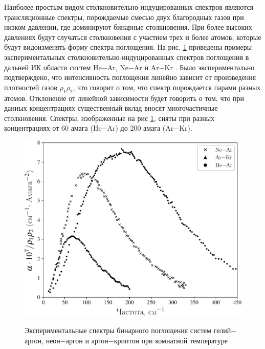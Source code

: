     Наиболее простым видом столкновительно-индуцированных спектров являются трансляционные спектры, порождаемые смесью двух благородных газов при низком давлении, где доминируют бинарные столкновения. При более высоких давлениях будут случаться столкновения с участием трех и более атомов, которые будут видоизменять форму спектра поглощения. На рис. \ref{pic-two-atom-experiment} приведены примеры экспериментальных столкновительно-индуцированных спектров поглощения в дальней ИК области систем He$-$Ar, Ne$-$Ar и Ar$-$Kr \cite{frommhold}. Было экспериментально подтверждено, что интенсивность поглощения линейно зависит от произведения плотностей газов $\rho_1 \rho_2$, что говорит о том, что спектр порождается парами разных атомов. Отклонение от линейной зависимости будет говорить о том, что при данных концентрациях существенный вклад вносят многочастичные столкновения. Спектры, изображенные на рис \ref{pic-two-atom-experiment}, сняты при разных концентрациях от 60 амага (He$-$Ar) до 200 амага (Ar$-$Kr).  

\begin{figure}[H]
    \centering
    \includegraphics[width=0.7\linewidth]{./pictures/twoatom_experiment/experiment_diatom_spectra-crop.pdf}
    \label{pic-two-atom-experiment}
    \caption{Экспериментальные спектры бинарного поглощения систем гелий$-$аргон, неон$-$аргон и аргон$-$криптон при комнатной температуре \cite{frommhold}}
\end{figure}

